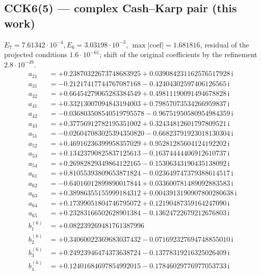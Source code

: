 \subsection*{CCK6(5) --- complex Cash--Karp pair (this work)}
$E_{7}=7.61342\cdot10^{-4}, E_{6}=3.03198\cdot10^{-3}$, $\max|\text{coef}|=1.681816$, residual of the projected conditions $1.6\cdot10^{-61}$; shift of the original coefficients by the refinement $2.8\cdot10^{-49}$. 
{\small\allowdisplaybreaks
\begin{align*}
a_{21} &= +0.23870322673748683925 + 0.039084231162576517928\,\mathrm{i}\\
a_{31} &= -0.21217417744767087168 - 0.42404302597406126565\,\mathrm{i}\\
a_{32} &= +0.66454279065283384549 + 0.49811190091494678828\,\mathrm{i}\\
a_{41} &= +0.33213007094843194003 + 0.79857073534266959837\,\mathrm{i}\\
a_{42} &= -0.036803508540519795578 - 0.96751950580954984359\,\mathrm{i}\\
a_{43} &= +0.37756912782195351002 + 0.32434812601797809521\,\mathrm{i}\\
a_{51} &= -0.026047083025394350820 - 0.66823791923018130304\,\mathrm{i}\\
a_{52} &= +0.46916236399958357029 + 0.95281285604124192202\,\mathrm{i}\\
a_{53} &= +0.13423790825837125613 - 0.16374444406912610737\,\mathrm{i}\\
a_{54} &= +0.26982829349864122165 - 0.15306343190435138092\,\mathrm{i}\\
a_{61} &= +0.81055393809653871824 - 0.023649747379388614517\,\mathrm{i}\\
a_{62} &= -0.64016012899890017844 + 0.033600781489092883583\,\mathrm{i}\\
a_{63} &= +0.38986355155999184312 + 0.0043913190907800280638\,\mathrm{i}\\
a_{64} &= +0.17399051804746795072 + 0.12190487359164247090\,\mathrm{i}\\
a_{65} &= +0.23283166502628901384 - 0.13624722679212676803\,\mathrm{i}\\[1mm]
b^{(6)}_{1} &= +0.082239269481761387996\\
b^{(6)}_{2} &= +0.34060022369683037432 - 0.071692327694748855010\,\mathrm{i}\\
b^{(6)}_{3} &= +0.24923946474373638724 - 0.13778319216325026409\,\mathrm{i}\\
b^{(6)}_{4} &= +0.12401684697854992015 - 0.17846029776977053733\,\mathrm{i}\\

\end{align*}}
